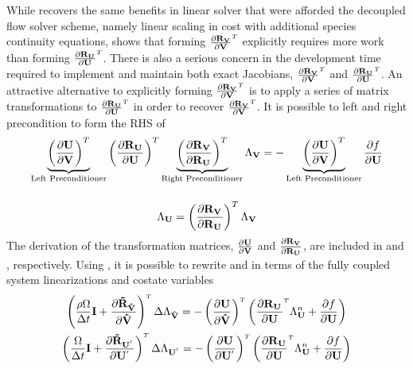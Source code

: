 While 
recovers the same benefits in linear solver that were afforded the decoupled
flow solver scheme, namely linear scaling in cost with additional species
continuity equations,  shows that forming
$\drvdv$ explicitly requires more work than forming
$\drudu$.  There is also a serious concern in the development time
required to implement and maintain both exact Jacobians, $\drvdv$ and $\drudu$.
An attractive alternative to explicitly forming $\drvdv$ is to apply a series of
matrix transformations to $\drudu$ in order to recover $\drvdv$.  It is possible
to left and right precondition  to form the RHS of
\begin{gather}
  \underbrace{
    \left( \frac{\partial \mathbf U}{\partial \mathbf V} \right)^{T}
  }_\text{Left Preconditioner}
  \left( \frac{\partial \mathbf R_{{\mathbf U}_{}}}{\partial \mathbf U} \right)^{T}
  \underbrace{
    \left( \frac{\partial \mathbf R_{{\mathbf V}_{}}}{\partial \mathbf R_{{\mathbf U}_{}}} \right)^{T}
  }_\text{Right Preconditioner}
  \Lambda_{\mathbf V}
  = 
  -
  \underbrace{
    \left( \frac{\partial \mathbf U}{\partial \mathbf V} \right)^{T}
  }_\text{Left Preconditioner}
  \frac{\partial f}{\partial \mathbf U} 
  \label{fc-to-dc-adj} \\[12pt]
  \Lambda_{\mathbf U} = \left( \frac{\partial \mathbf R_{{\mathbf V}_{}}}{\partial \mathbf R_{{\mathbf U}_{}}} \right)^{T} \Lambda_{\mathbf V}
  \label{right-precond}
\end{gather}
The derivation of the transformation matrices, $\frac{\partial \mathbf U}{\partial \mathbf V}$ and
$\frac{\partial \mathbf R_{{\mathbf V}_{}}}{\partial \mathbf R_{{\mathbf U}_{}}}$, are included in  and
, respectively.  Using
, it is possible to rewrite
 and  in terms of the fully
coupled system linearizations and costate variables
\begin{gather}
  \left(
  \frac{\rho \vol}{\Delta t} \mi + \pd{\mathbf{\tilde{R}_{\Vhat}}}{\Vhat}
  \right)^{\mathsmaller T} \Delta \adjlam{\Vhat}
  =
  - \left( \pd{\mU}{\Vhat} \right)^{\mathsmaller T}
  \left(\pd{\ru{}}{\mU}^{\mathsmaller T}\adjlam{\mU}^n + \pd{f}{\mU} \right)
  \label{dc-fc-species-adj-time} \\
  \left(
  \frac{\vol}{\Delta t} \mi + \pd{\mathbf{\tilde{R}_{\Up}}}{\Up}
  \right)^{\mathsmaller T} \Delta \adjlam{\Up}
  =
  - \left( \pd{\mU}{\Up} \right)^{\mathsmaller T}
  \left(\pd{\ru{}}{\mU}^{\mathsmaller T}\adjlam{\mU}^n + \pd{f}{\mU} \right)
  \label{dc-fc-mixture-adj-time}
\end{gather}
